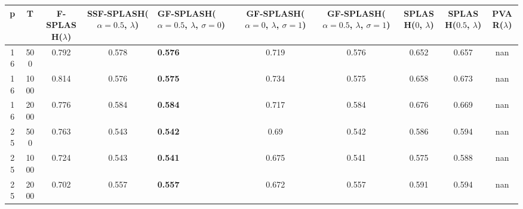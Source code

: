 \begin{tabular}{cccclccccc}
\hline
  p  &  T   &  F-SPLASH($\lambda$)  &  SSF-SPLASH($\alpha=0.5$, $\lambda$)  & GF-SPLASH($\alpha=0.5$, $\lambda$, $\sigma=0$)   &  GF-SPLASH($\alpha=0$, $\lambda$, $\sigma=1$)  &  GF-SPLASH($\alpha=0.5$, $\lambda$, $\sigma=1$)  &  SPLASH($0$, $\lambda$)  &  SPLASH($0.5$, $\lambda$)  &  PVAR($\lambda$)  \\
\hline
 16  & 500  &         0.792         &                 0.578                 & \textbf{0.576}                                   &                     0.719                      &                      0.576                       &          0.652           &           0.657            &        nan        \\
 16  & 1000 &         0.814         &                 0.576                 & \textbf{0.575}                                   &                     0.734                      &                      0.575                       &          0.658           &           0.673            &        nan        \\
 16  & 2000 &         0.776         &                 0.584                 & \textbf{0.584}                                   &                     0.717                      &                      0.584                       &          0.676           &           0.669            &        nan        \\
 25  & 500  &         0.763         &                 0.543                 & \textbf{0.542}                                   &                      0.69                      &                      0.542                       &          0.586           &           0.594            &        nan        \\
 25  & 1000 &         0.724         &                 0.543                 & \textbf{0.541}                                   &                     0.675                      &                      0.541                       &          0.575           &           0.588            &        nan        \\
 25  & 2000 &         0.702         &                 0.557                 & \textbf{0.557}                                   &                     0.672                      &                      0.557                       &          0.591           &           0.594            &        nan        \\
\hline
\end{tabular}